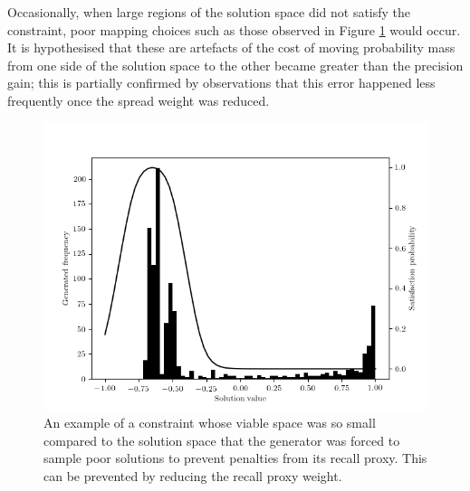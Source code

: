 \documentclass[../../main.tex]{subfiles}
\begin{document}
Occasionally, when large regions of the solution space did not satisfy the constraint, poor mapping choices such as those observed in Figure \ref{fig:embeddedConstraintTooSparse} would occur.
It is hypothesised that these are artefacts of the cost of moving probability mass from one side of the solution space to the other became greater than the precision gain; this is partially confirmed by observations that this error happened less frequently once the spread weight was reduced.
\begin{figure}[H]
    \begin{center}
    \includegraphics[width=\textwidth]{embeddedConstraint4}
    \caption{
        An example of a constraint whose viable space was so small compared to the solution space that the generator was forced to sample poor solutions to prevent penalties from its recall proxy.
        This can be prevented by reducing the recall proxy weight.
    }
    \label{fig:embeddedConstraintTooSparse}
    \end{center}
\end{figure}
\end{document}

